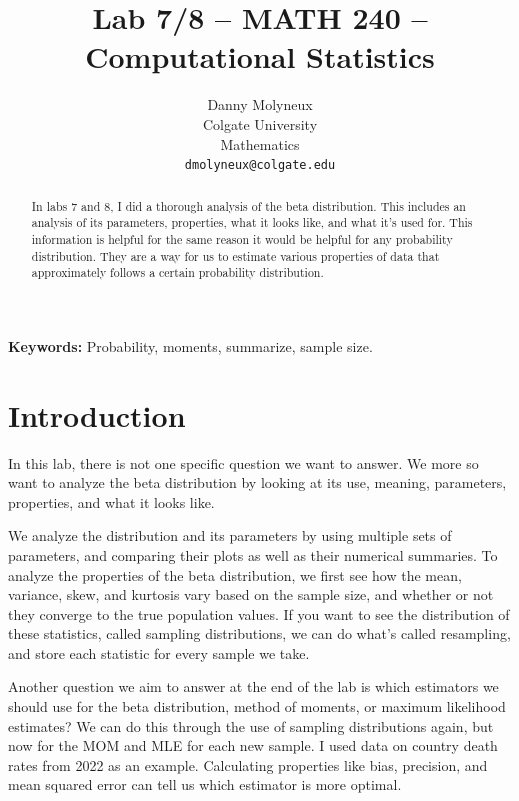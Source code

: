 \documentclass{article}\usepackage[]{graphicx}\usepackage[]{xcolor}
\begin{document}
\vspace{-1in}
\title{Lab 7/8 -- MATH 240 -- Computational Statistics}

\author{
  Danny Molyneux \\
  Colgate University  \\
  Mathematics  \\
  {\tt dmolyneux@colgate.edu}
}


\maketitle

\begin{multicols}{2} \raggedcolumns
\begin{abstract}
In labs 7 and 8, I did a thorough analysis of the beta distribution. This includes an analysis of its parameters, properties, what it looks like, and what it's used for. This information is helpful for the same reason it would be helpful for any probability distribution. They are a way for us to estimate various properties of data that approximately follows a certain probability distribution.
\end{abstract}
\noindent \textbf{Keywords:} Probability, moments, summarize, sample size.
\section{Introduction}
In this lab, there is not one specific question we want to answer. We more so want to analyze the beta distribution by looking at its use, meaning, parameters, properties, and what it looks like.

We analyze the distribution and its parameters by using multiple sets of parameters, and comparing their plots as well as their numerical summaries. To analyze the properties of the beta distribution, we first see how the mean, variance, skew, and kurtosis vary based on the sample size, and whether or not they converge to the true population values. If you want to see the distribution of these statistics, called sampling distributions, we can do what's called resampling, and store each statistic for every sample we take. 

Another question we aim to answer at the end of the lab is which estimators we should use for the beta distribution, method of moments, or maximum likelihood estimates? We can do this through the use of sampling distributions again, but now for the MOM and MLE for each new sample. I used data on country death rates from 2022 as an example. Calculating properties like bias, precision, and mean squared error can tell us which estimator is more optimal. 

\end{multicols}
\end{document}
